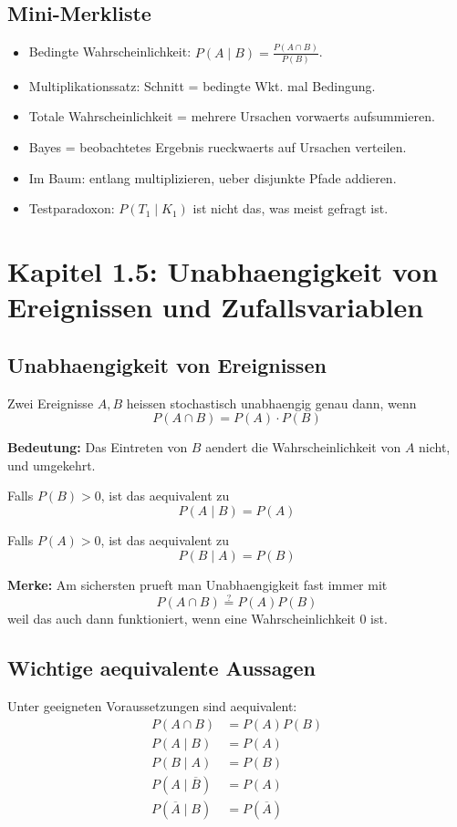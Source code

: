 \documentclass[a4paper,11pt]{article}
\begin{document}
\subsection{Mini-Merkliste}
\begin{itemize}
  \item Bedingte Wahrscheinlichkeit: $\displaystyle P(A\mid B)=\frac{P(A\cap B)}{P(B)}$.
  \item Multiplikationssatz: Schnitt = bedingte Wkt. mal Bedingung.
  \item Totale Wahrscheinlichkeit = mehrere Ursachen vorwaerts aufsummieren.
  \item Bayes = beobachtetes Ergebnis rueckwaerts auf Ursachen verteilen.
  \item Im Baum: entlang multiplizieren, ueber disjunkte Pfade addieren.
  \item Testparadoxon: $P(T_1\mid K_1)$ ist nicht das, was meist gefragt ist.
\end{itemize}

\section{Kapitel 1.5: Unabhaengigkeit von Ereignissen und Zufallsvariablen}

\subsection{Unabhaengigkeit von Ereignissen}
Zwei Ereignisse $A,B$ heissen stochastisch unabhaengig genau dann, wenn
\[
P(A \cap B)=P(A)\cdot P(B)
\]

\textbf{Bedeutung:}
Das Eintreten von $B$ aendert die Wahrscheinlichkeit von $A$ nicht, und umgekehrt.

Falls $P(B)>0$, ist das aequivalent zu
\[
P(A\mid B)=P(A)
\]

Falls $P(A)>0$, ist das aequivalent zu
\[
P(B\mid A)=P(B)
\]

\textbf{Merke:}
Am sichersten prueft man Unabhaengigkeit fast immer mit
\[
P(A \cap B)\stackrel{?}{=}P(A)P(B)
\]
weil das auch dann funktioniert, wenn eine Wahrscheinlichkeit $0$ ist.

\subsection{Wichtige aequivalente Aussagen}
Unter geeigneten Voraussetzungen sind aequivalent:
\begin{align*}
P(A \cap B)&=P(A)P(B) \\
P(A\mid B)&=P(A) \\
P(B\mid A)&=P(B) \\
P(A\mid \overline{B})&=P(A) \\
P(\overline{A}\mid B)&=P(\overline{A})
\end{align*}
\end{document}
